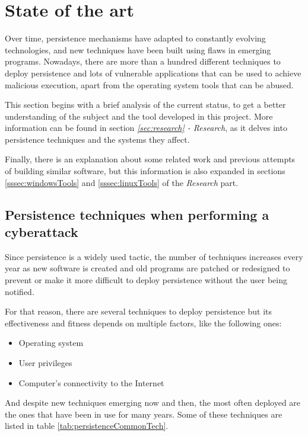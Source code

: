 \section{State of the art}
\label{sec:stateOfArt}
Over time, persistence mechanisms have adapted to constantly evolving technologies, and new techniques have been built using flaws in emerging programs. Nowadays, there are more than a hundred different techniques to deploy persistence and lots of vulnerable applications that can be used to achieve malicious execution, apart from the operating system tools that can be abused. 

This section begins with a brief analysis of the current status, to get a better understanding of the subject and the tool developed in this project. More information can be found in section \textit{\ref{sec:research} - Research}, as it delves into persistence techniques and the systems they affect. 

Finally, there is an explanation about some related work and previous attempts of building similar software, but this information is also expanded in sections \ref{sssec:windowsTools} and \ref{sssec:linuxTools} of the \textit{Research} part.

\subsection{Persistence techniques when performing a cyberattack}
\label{ssec:persistencetechniques}
Since persistence is a widely used tactic, the number of techniques increases every year as new software is created and old programs are patched or redesigned to prevent or make it more difficult to deploy persistence without the user being notified.

For that reason, there are several techniques to deploy persistence but its effectiveness and fitness depends on multiple factors, like the following ones:

\begin{itemize}
\item Operating system
\item User privileges
\item Computer's connectivity to the Internet
\end{itemize}

And despite new techniques emerging now and then, the most often deployed are the ones that have been in use for many years. Some of these techniques are listed in table \ref{tab:persistenceCommonTech}.\\

